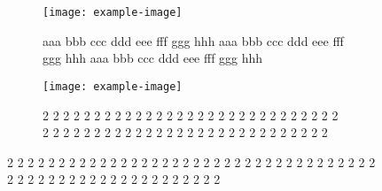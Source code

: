\documentclass{article}
\begin{document}
\begin{figure}[h!]
	\begin{subfigure}[t]{0.49\linewidth}
		\centering
		\texttt{[image: example-image]}
		\caption{aaa bbb ccc ddd eee fff ggg hhh aaa bbb ccc ddd eee fff ggg hhh aaa bbb ccc ddd eee fff ggg hhh }
	\end{subfigure}\hfill
	\begin{subfigure}[t]{0.49\linewidth}
		\centering
		\texttt{[image: example-image]}
		\caption{2 2 2 2 2 2 2 2 2 2 2 2 2 2 2 2 2 2 2 2 2 2 2 2 2 2 2 2 2 2 2 2 2 2 2 2 2 2 2 2 2 2 2 2 2 2 2 2 2 2 2 2 2 2 2 2 2}
	\end{subfigure}
\end{figure}
\end{document}
